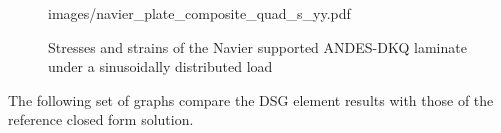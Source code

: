 \begin{figure}[H]
{		{images/navier_plate_composite_quad_s_yy.pdf}}
	\\
	\caption{\label{Navier_quad_composite_s_xx_yy}Stresses and strains of the Navier supported ANDES-DKQ laminate under a sinusoidally distributed load}
\end{figure}

The following set of graphs compare the DSG element results with those of the reference closed form solution.


